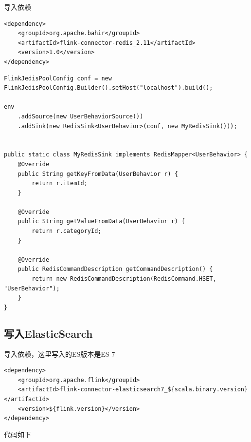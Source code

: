 \documentclass[cn,11pt,chinese]{elegantbook}
\begin{document}
导入依赖

\begin{verbatim}
<dependency>
    <groupId>org.apache.bahir</groupId>
    <artifactId>flink-connector-redis_2.11</artifactId>
    <version>1.0</version>
</dependency>
\end{verbatim}

\begin{verbatim}
FlinkJedisPoolConfig conf = new FlinkJedisPoolConfig.Builder().setHost("localhost").build();

env
    .addSource(new UserBehaviorSource())
    .addSink(new RedisSink<UserBehavior>(conf, new MyRedisSink()));
    
    
public static class MyRedisSink implements RedisMapper<UserBehavior> {
    @Override
    public String getKeyFromData(UserBehavior r) {
        return r.itemId;
    }
    
    @Override
    public String getValueFromData(UserBehavior r) {
        return r.categoryId;
    }
    
    @Override
    public RedisCommandDescription getCommandDescription() {
        return new RedisCommandDescription(RedisCommand.HSET, "UserBehavior");
    }
}
\end{verbatim}

\subsection{写入ElasticSearch}

导入依赖，这里写入的ES版本是ES 7

\begin{verbatim}
<dependency>
    <groupId>org.apache.flink</groupId>
    <artifactId>flink-connector-elasticsearch7_${scala.binary.version}</artifactId>
    <version>${flink.version}</version>
</dependency>
\end{verbatim}

代码如下
\end{document}
